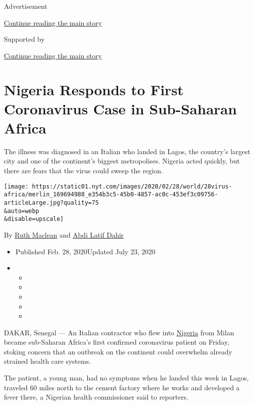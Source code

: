 Advertisement

\protect\hyperlink{after-top}{Continue reading the main story}

Supported by

\protect\hyperlink{after-sponsor}{Continue reading the main story}

\hypertarget{nigeria-responds-to-first-coronavirus-case-in-sub-saharan-africa}{%
\section{Nigeria Responds to First Coronavirus Case in Sub-Saharan
Africa}\label{nigeria-responds-to-first-coronavirus-case-in-sub-saharan-africa}}

The illness was diagnosed in an Italian who landed in Lagos, the
country's largest city and one of the continent's biggest metropolises.
Nigeria acted quickly, but there are fears that the virus could sweep
the region.

\texttt{[image: https://static01.nyt.com/images/2020/02/28/world/28virus-africa/merlin\_169694988\_e354b3c5-45b0-4857-ac0c-453ef3c09756-articleLarge.jpg?quality=75\\\&auto=webp\\\&disable=upscale]}

By \href{https://www.nytimes.com/by/ruth-maclean}{Ruth Maclean} and
\href{https://www.nytimes.com/by/abdi-latif-dahir}{Abdi Latif Dahir}

\begin{itemize}
\item
  Published Feb. 28, 2020Updated July 23, 2020
\item
  \begin{itemize}
  \item
  \item
  \item
  \item
  \item
  \end{itemize}
\end{itemize}

DAKAR, Senegal --- An Italian contractor who flew into
\href{https://www.nytimes.com/2020/07/23/world/africa/aid-workers-executed-nigeria.html}{Nigeria}
from Milan became sub-Saharan Africa's first confirmed coronavirus
patient on Friday, stoking concern that an outbreak on the continent
could overwhelm already strained health care systems.

The patient, a young man, had no symptoms when he landed this week in
Lagos, traveled 60 miles north to the cement factory where he works and
developed a fever there, a Nigerian health commissioner said to
reporters.

